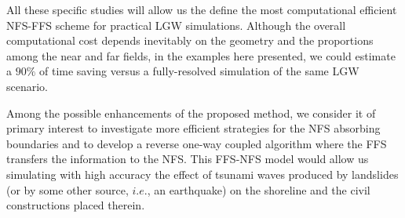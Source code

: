 All these specific studies will allow us the define the most computational efficient NFS-FFS scheme for practical LGW simulations.  Although the overall computational cost depends inevitably on the geometry and the proportions among the near and far fields, in the examples here presented, we could estimate a $90\%$ of time saving versus a fully-resolved simulation of the same LGW scenario.


Among the possible enhancements of the proposed method, we consider it of primary interest to investigate more efficient strategies for the NFS absorbing boundaries and to develop a reverse one-way coupled algorithm where the FFS transfers the information to the NFS. This FFS-NFS model would allow us simulating with high accuracy the effect of tsunami waves produced by landslides (or by some other source, $i.e.$, an earthquake) on the shoreline and the civil constructions placed therein.

